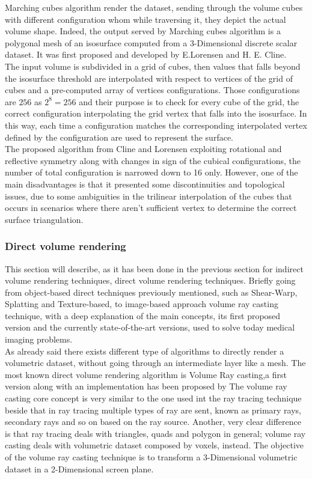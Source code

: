 \documentclass[10pt,a4paper]{article}
\begin{document}
Marching cubes algorithm render the dataset, sending through the volume cubes with different configuration whom while traversing it, they depict the actual volume shape. Indeed, the output served by Marching cubes algorithm is a polygonal mesh of an isosurface computed from a 3-Dimensional discrete scalar dataset. It was first proposed and developed by E.Lorensen and H. E. Cline.\\ The input volume is subdivided in a grid of cubes, then values that falls beyond the isosurface threshold are interpolated with respect to vertices of the grid of cubes and a pre-computed array of vertices configurations. Those configurations are $256$ as $2^8 = 256$ and their purpose is to check for every cube of the grid, the correct configuration interpolating the grid vertex that falls into the isosurface. In this way, each time a configuration matches the corresponding interpolated vertex defined by the configuration are used to represent the surface.\\

The proposed algorithm from Cline and Lorensen exploiting rotational and reflective symmetry along with changes in sign of the cubical configurations, the number of total configuration is narrowed down to 16 only. However, one of the main disadvantages is that it presented some discontinuities and topological issues, due to some ambiguities in the trilinear interpolation of the cubes that occurs in scenarios where there aren't sufficient vertex to determine the correct surface triangulation. %

\subsubsection{Direct volume rendering} %
This section will describe, as it has been done in the previous section for indirect volume rendering techniques, direct volume rendering techniques. Briefly going from object-based direct techniques previously mentioned, such as Shear-Warp, Splatting and Texture-based, to image-based approach volume ray casting technique, with a deep explanation of the main concepts, its first proposed version and the currently state-of-the-art versions, used to solve today medical imaging problems.\\

As already said there exists different type of algorithms to directly render a volumetric dataset, without going through an intermediate layer like a mesh.
The most known direct volume rendering algorithm is Volume Ray casting,a first version along with an implementation has been proposed by %
The volume ray casting core concept is very similar to the one used int the ray tracing technique beside that in ray tracing multiple types of ray are sent, known as primary rays, secondary rays and so on based on the ray source. Another, very clear difference is that ray tracing deals with triangles, quads and polygon in general; volume ray casting deals with volumetric dataset composed by voxels, instead.
The objective of the volume ray casting technique is to transform a 3-Dimensional volumetric dataset in a 2-Dimensional screen plane.\\
\end{document}
